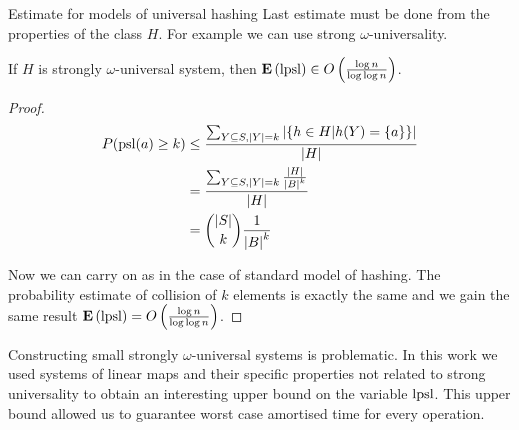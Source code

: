 \begin{section}{Estimate for models of universal hashing}
Last estimate must be done from the properties of the class $H$. For example we can use strong $\omega$-universality.

\begin{theorem}
If $H$ is strongly $\omega$-universal system, then $\mathbf{E}\left(\mathrm{lpsl}\right) \in O\left(\frac{\log n}{\log \log n}\right)$.
\end{theorem}
\begin{proof}
\begin{displaymath}
\begin{split}
P(\mathrm{psl}(a) \geq k) 
	& \leq \frac{\sum\displaylimits_{Y \subseteq S, |Y| = k} | \{ h \in H | h(Y) = \{a\} \}|}{|H|} \\
	& = \frac{\sum\displaylimits_{Y \subseteq S, |Y| = k} \frac{|H|}{{|B|}^{k}}}{|H|} \\
	& = \dbinom{|S|}{k}\frac{1}{{|B|}^k}
\end{split}
\end{displaymath}

Now we can carry on as in the case of standard model of hashing. The probability estimate of collision of $k$ elements is exactly the same and we gain the same result $\mathbf{E}\left(\mathrm{lpsl}\right) = O\left(\frac{\log n}{\log \log n}\right)$.
\end{proof}

Constructing small strongly $\omega$-universal systems is problematic. In this work we used systems of linear maps and their specific properties not related to strong universality to obtain an interesting upper bound on the variable $\mathrm{lpsl}$. This upper bound allowed us to guarantee worst case amortised time for every operation.
\end{section}
